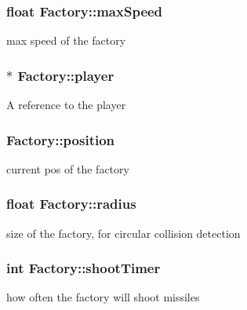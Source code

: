 \subsubsection[{\texorpdfstring{max\+Speed}{maxSpeed}}]{\setlength{\rightskip}{0pt plus 5cm}float Factory\+::max\+Speed\hspace{0.3cm}{\ttfamily [private]}}\hypertarget{class_factory_aa7bec46e699e843b75899c6311358370}{}\label{class_factory_aa7bec46e699e843b75899c6311358370}
max speed of the factory 
\subsubsection[{\texorpdfstring{player}{player}}]{$\ast$ Factory\+::player\hspace{0.3cm}{\ttfamily [private]}}\hypertarget{class_factory_a41f72cef38976b5cd6f5bfae2f1e0793}{}\label{class_factory_a41f72cef38976b5cd6f5bfae2f1e0793}
A reference to the player 
\subsubsection[{\texorpdfstring{position}{position}}]{ Factory\+::position\hspace{0.3cm}{\ttfamily [private]}}\hypertarget{class_factory_af5a5d19e6d5a0d4856cb6f78c3a53bdb}{}\label{class_factory_af5a5d19e6d5a0d4856cb6f78c3a53bdb}
current pos of the factory 
\subsubsection[{\texorpdfstring{radius}{radius}}]{\setlength{\rightskip}{0pt plus 5cm}float Factory\+::radius\hspace{0.3cm}{\ttfamily [private]}}\hypertarget{class_factory_a4a3444b334f5c7f53cf314dce9771170}{}\label{class_factory_a4a3444b334f5c7f53cf314dce9771170}
size of the factory, for circular collision detection 
\subsubsection[{\texorpdfstring{shoot\+Timer}{shootTimer}}]{\setlength{\rightskip}{0pt plus 5cm}int Factory\+::shoot\+Timer\hspace{0.3cm}{\ttfamily [private]}}\hypertarget{class_factory_a7760f2b8585ba42e755fd2bcca51d317}{}\label{class_factory_a7760f2b8585ba42e755fd2bcca51d317}
how often the factory will shoot missiles 
